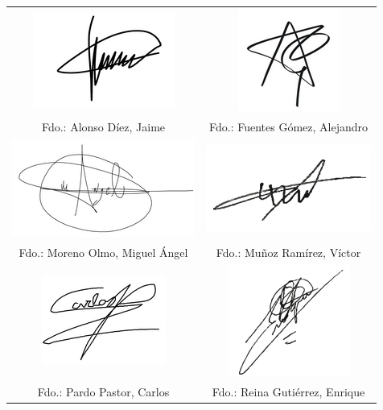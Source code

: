 \documentclass[]{article}
\begin{document}
\begin{table}[!htb]
\begin{tabular}{ c c }

\includegraphics[scale=0.75]{Firmas/Jaime}
& 
\includegraphics[scale=1]{Firmas/Alejandro} \\


Fdo.: Alonso Díez,  Jaime
&
Fdo.: Fuentes Gómez, Alejandro \\

\includegraphics[scale=0.75]{Firmas/MiguelAngel}
&
\includegraphics[scale=0.75]{Firmas/Victor} \\

Fdo.: Moreno Olmo, Miguel Ángel
&
Fdo.: Muñoz Ramírez, Víctor \\

\includegraphics[scale=0.75]{Firmas/Carlos}
&
\includegraphics[scale=0.75]{Firmas/Enrique} \\

Fdo.: Pardo Pastor, Carlos
&
Fdo.: Reina Gutiérrez, Enrique

\end{tabular}
\end{table}
\end{document}
